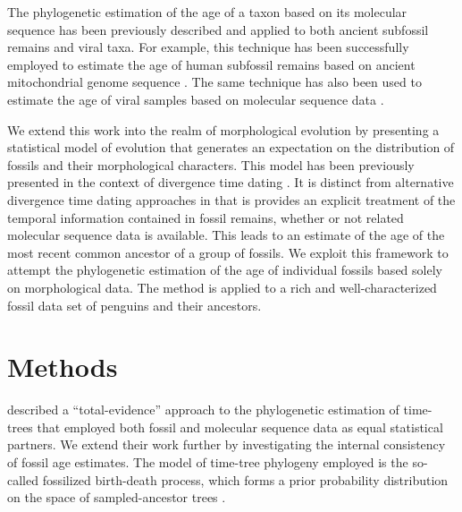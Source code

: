 \documentclass[11pt]{article}
\begin{document}
The phylogenetic estimation of the age of a taxon based on its molecular sequence has been previously described \autocite{drummond2002computational,shapiro2011bayesian} and applied to both ancient subfossil remains and viral taxa. For example, this technique has been successfully employed to estimate the age of human subfossil remains based on ancient mitochondrial genome sequence \autocite{meyer2014mitochondrial}. The same technique has also been used to estimate the age of viral samples based on molecular sequence data \autocite{gray2013evolutionary}.


We extend this work into the realm of morphological evolution by presenting a statistical model of evolution that generates an expectation on the distribution of fossils and their morphological characters. This model has been previously presented in the context of divergence time dating \autocite{gavr2014,gavryushkina2015bayesian}. It is distinct from alternative divergence time dating approaches in that is provides an explicit treatment of the temporal information contained in fossil remains, whether or not related molecular sequence data is available. This leads to an estimate of the age of the most recent common ancestor of a group of fossils. We exploit this framework to attempt the phylogenetic estimation of the age of individual fossils based solely on morphological data. The method is applied to a rich and well-characterized fossil data set of penguins and their ancestors.

\section*{Methods}

\textcite{gavryushkina2015bayesian} described a ``total-evidence'' approach to the phylogenetic estimation of time-trees that employed both fossil and molecular sequence data as equal statistical partners. We extend their work further by investigating the internal consistency of fossil age estimates. The model of time-tree phylogeny employed is the so-called fossilized birth-death process, which forms a prior probability distribution on the space of sampled-ancestor trees \autocite{Gavr2013}.
\end{document}
